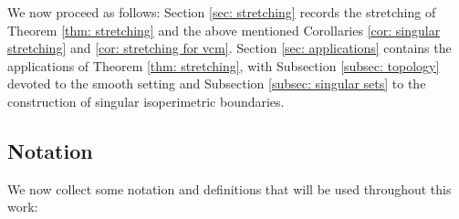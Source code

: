 \documentclass[12pt]{article}
\begin{document}
We now proceed as follows: Section \ref{sec: stretching} records the stretching of Theorem \ref{thm: stretching} and the above mentioned Corollaries \ref{cor: singular stretching} and \ref{cor: stretching for vcm}. Section \ref{sec: applications} contains the applications of Theorem \ref{thm: stretching}, with Subsection \ref{subsec: topology} devoted to the smooth setting and Subsection \ref{subsec: singular sets} to the construction of singular isoperimetric boundaries.

\subsection{Notation}\label{subsec: notation}


We now collect some notation and definitions that will be used throughout this work:
\end{document}
